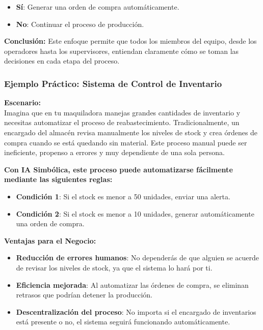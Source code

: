 \documentclass[
  10pt,
  letterpaper,
]{book}
\providecommand{\tightlist}{%
  \setlength{\itemsep}{0pt}\setlength{\parskip}{0pt}}\usepackage{longtable,booktabs,array}
\begin{document}
\begin{enumerate}
\begin{itemize}
    \begin{itemize}
    \tightlist
    \item
      \textbf{Sí}: Generar una orden de compra automáticamente.
    \item
      \textbf{No}: Continuar el proceso de producción.
    \end{itemize}
  \end{itemize}

  \textbf{Conclusión:} Este enfoque permite que todos los miembros del
  equipo, desde los operadores hasta los supervisores, entiendan
  claramente cómo se toman las decisiones en cada etapa del proceso.
\end{enumerate}

\subsubsection{Ejemplo Práctico: Sistema de Control de
Inventario}\label{ejemplo-pruxe1ctico-sistema-de-control-de-inventario}

\textbf{Escenario:}\\
Imagina que en tu maquiladora manejas grandes cantidades de inventario y
necesitas automatizar el proceso de reabastecimiento. Tradicionalmente,
un encargado del almacén revisa manualmente los niveles de stock y crea
órdenes de compra cuando se está quedando sin material. Este proceso
manual puede ser ineficiente, propenso a errores y muy dependiente de
una sola persona.

\textbf{Con IA Simbólica, este proceso puede automatizarse fácilmente
mediante las siguientes reglas:}

\begin{itemize}
\tightlist
\item
  \textbf{Condición 1}: Si el stock es menor a 50 unidades, enviar una
  alerta.
\item
  \textbf{Condición 2}: Si el stock es menor a 10 unidades, generar
  automáticamente una orden de compra.
\end{itemize}

\textbf{Ventajas para el Negocio:}

\begin{itemize}
\tightlist
\item
  \textbf{Reducción de errores humanos}: No dependerás de que alguien se
  acuerde de revisar los niveles de stock, ya que el sistema lo hará por
  ti.
\item
  \textbf{Eficiencia mejorada}: Al automatizar las órdenes de compra, se
  eliminan retrasos que podrían detener la producción.
\item
  \textbf{Descentralización del proceso}: No importa si el encargado de
  inventarios está presente o no, el sistema seguirá funcionando
  automáticamente.
\end{itemize}
\end{document}
